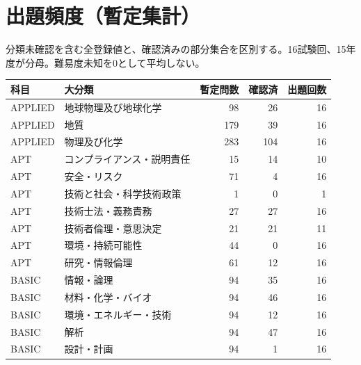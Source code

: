 \chapter{出題頻度（暫定集計）}
分類未確認を含む全登録値と、確認済みの部分集合を区別する。16試験回、15年度が分母。難易度未知を0として平均しない。
\begin{longtable}{p{.16\linewidth}p{.42\linewidth}rrr}
科目 & 大分類 & 暫定問数 & 確認済 & 出題回数\\\hline
APPLIED & 地球物理及び地球化学 & 98 & 26 & 16\\
APPLIED & 地質 & 179 & 39 & 16\\
APPLIED & 物理及び化学 & 283 & 104 & 16\\
APT & コンプライアンス・説明責任 & 15 & 14 & 10\\
APT & 安全・リスク & 71 & 4 & 16\\
APT & 技術と社会・科学技術政策 & 1 & 0 & 1\\
APT & 技術士法・義務責務 & 27 & 27 & 16\\
APT & 技術者倫理・意思決定 & 21 & 21 & 11\\
APT & 環境・持続可能性 & 44 & 0 & 16\\
APT & 研究・情報倫理 & 61 & 12 & 16\\
BASIC & 情報・論理 & 94 & 35 & 16\\
BASIC & 材料・化学・バイオ & 94 & 46 & 16\\
BASIC & 環境・エネルギー・技術 & 94 & 12 & 16\\
BASIC & 解析 & 94 & 47 & 16\\
BASIC & 設計・計画 & 94 & 1 & 16\\
\end{longtable}
